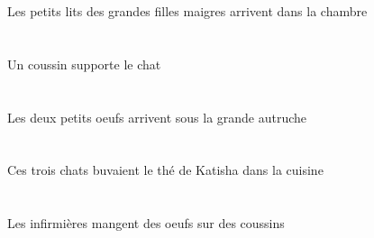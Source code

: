 \begin{exe}
Les petits lits des grandes filles maigres arrivent dans la chambre
\ex\glll
\INDSgErg{}   \coussinBSgErg{}   \DEFSgAbs{}   \chatDSgAbs{}  \supporterVtPrsDSg{}\\
\INDSgErgP{}   \coussinBSgErgP{}   \DEFSgAbsP{}   \chatDSgAbsP{}  \supporterVtPrsDSgP{}\\
\INDSgErgG{}   \coussinBSgErgG{}   \DEFSgAbsG{}   \chatDSgAbsG{}  \supporterVtPrsDSgG{}\\
Un coussin supporte le chat
\ex\glll
\DEFDuAbs{}   \petitCDu{}   \oeufCDuAbs{}    \DEFSgObl{}   \grandBSg{}   \autrucheBSgObl{}   \SOUS{}  \arriverViPrsCDu{}\\
\DEFDuAbsP{}   \petitCDuP{}   \oeufCDuAbsP{}    \DEFSgOblP{}   \grandBSgP{}   \autrucheBSgOblP{}   \SOUSP{}  \arriverViPrsCDuP{}\\
\DEFDuAbsG{}   \petitCDuG{}   \oeufCDuAbsG{}    \DEFSgOblG{}   \grandBSgG{}   \autrucheBSgOblG{}   \SOUSG{}  \arriverViPrsCDuG{}\\
Les deux petits oeufs arrivent sous la grande autruche
\ex\glll
\DEFSgObl{}   \cuisineDSgObl{}   \DANS{}   \DEMPlErg{}   \troisDPl{}   \chatDPlErg{}   \DEFSgAbs{}    \INDSgObl{}   \KatishaASgObl{}   \DE{}   \theBSgAbs{}  \boireVtPstBSg{}\\
\DEFSgOblP{}   \cuisineDSgOblP{}   \DANSP{}   \DEMPlErgP{}   \troisDPlP{}   \chatDPlErgP{}   \DEFSgAbsP{}    \INDSgOblP{}   \KatishaASgOblP{}   \DEP{}   \theBSgAbsP{}  \boireVtPstBSgP{}\\
\DEFSgOblG{}   \cuisineDSgOblG{}   \DANSG{}   \DEMPlErgG{}   \troisDPlG{}   \chatDPlErgG{}   \DEFSgAbsG{}    \INDSgOblG{}   \KatishaASgOblG{}   \DEG{}   \theBSgAbsG{}  \boireVtPstBSgG{}\\
Ces trois chats buvaient le thé de Katisha dans la cuisine
\ex\glll
\INDPlObl{}   \coussinBPlObl{}   \SUR{}   \DEFPlErg{}   \infirmiereAPlErg{}   \INDPlAbs{}   \oeufCPlAbs{}  \mangerVtPrsCPl{}\\
\INDPlOblP{}   \coussinBPlOblP{}   \SURP{}   \DEFPlErgP{}   \infirmiereAPlErgP{}   \INDPlAbsP{}   \oeufCPlAbsP{}  \mangerVtPrsCPlP{}\\
\INDPlOblG{}   \coussinBPlOblG{}   \SURG{}   \DEFPlErgG{}   \infirmiereAPlErgG{}   \INDPlAbsG{}   \oeufCPlAbsG{}  \mangerVtPrsCPlG{}\\
Les infirmières mangent des oeufs sur des coussins
\ex\glll
\INDPlObl{}   \jauneAPl{}   \balaiAPlObl{}   \AVEC{}   \DEFPlErg{}   \troisCPl{}   \filleCPlErg{}   \DEMDuAbs{}    \DEFSgObl{}   \rougeDSg{}   \maisonDSgObl{}   \DEVANT{}   \coyoteCDuAbs{}  \chasserVtPrsCDu{}\\

\end{exe}
